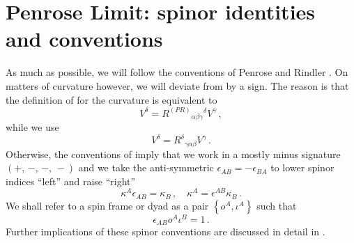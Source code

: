 \chapter{Penrose Limit: spinor identities and conventions}\label{Penrose:app:conventions}

As much as possible, we will follow the conventions of Penrose and Rindler \cite{Penrose:1985bww}. On matters of curvature however, we will deviate from \cite{Penrose:1985bww} by a sign. The reason is that the definition of \cite{Penrose:1985bww} for the curvature is equivalent to 
\begin{equation}
[\nabla_{\alpha}, \nabla_{\beta}]V^{\delta} = R^{(PR)}{}_{\alpha \beta \gamma}{}^{\delta}V^{\gamma} \, ,
\end{equation}
while we use
\begin{equation}
[\nabla_{\alpha}, \nabla_{\beta}]V^{\delta} = R^{\delta}{}_{\gamma \alpha \beta}{}V^{\gamma} \, .
\end{equation}
Otherwise, the conventions of \cite{Penrose:1985bww} imply that we work in a mostly minus signature $(+,\,-,\,-,\,-)$ and we take the anti-symmetric $\epsilon_{AB} = - \epsilon_{BA}$ to lower spinor indices ``left'' and raise ``right''
\begin{equation}
\kappa^A \epsilon_{AB} = \kappa_B \, , \quad \kappa^A = \epsilon^{AB}\kappa_B \, .
\end{equation}
We shall refer to a spin frame or dyad as a pair $\left\lbrace o^A, \iota^A \right \rbrace$ such that
\begin{equation}\label{Penrose:eqn:dyadnorm}
\epsilon_{AB} o^A \iota^B = 1\, .
\end{equation}
Further implications of these spinor conventions are discussed in detail in \cite{Penrose:1985bww}.
